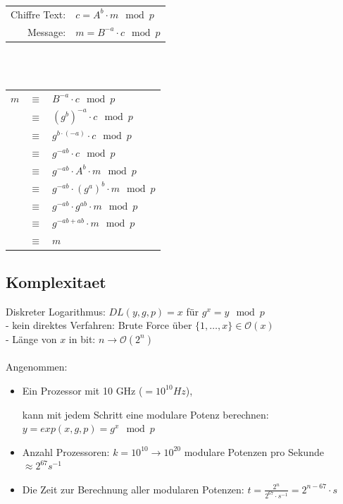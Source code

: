 \documentclass[
  a4paper,
  11pt,
]{article}
\begin{document}
\begin{center}

\begin{tabular}{rl}
	Chiffre Text:	&	$c=A^b\cdot m\mod p$\\
	Message:		&	$m=B^{-a}\cdot c\mod p$\\
\end{tabular}

\ \\ \ \\

\begin{tabular}{rcl}
	$m$		&	$\equiv$ &	$B^{-a}\cdot c\mod p$\\
			&	$\equiv$	&	$(g^b)^{-a}\cdot c\mod p$\\
			&	$\equiv$	&	$g^{b\cdot (-a)}\cdot c\mod p$\\
			&	$\equiv$	&	$g^{-ab}\cdot c\mod p$\\
			&	$\equiv$	&	$g^{-ab}\cdot A^b\cdot m\mod p$\\
			&	$\equiv$	&	$g^{-ab}\cdot (g^a)^b\cdot m\mod p$\\
			&	$\equiv$	&	$g^{-ab}\cdot g^{ab}\cdot m\mod p$\\
			&	$\equiv$	&	$g^{-ab+ab}\cdot m\mod p$\\
			&	$\equiv$	&	$m$\\
\end{tabular}
\end{center}

\subsection*{Komplexitaet}
\label{sub:Komplexitaet}

Diskreter Logarithmus: $DL(y, g, p) = x$ für $g^x=y\mod p$\\
- kein direktes Verfahren: Brute Force über $\{1, \ldots, x\}\in \mathcal O(x)$\\
- Länge von $x$ in bit: $n \rightarrow \mathcal O(2^n)$\\\\

Angenommen:\\
\begin{itemize}
  \item Ein Prozessor mit 10 GHz ($= 10^{10}Hz$),

    kann mit jedem Schritt eine modulare Potenz berechnen: $y=exp(x,g,p)=g^x\mod
    p$
  \item Anzahl Prozessoren: $k=10^{10} \rightarrow 10^{20}$ modulare Potenzen
    pro Sekunde $\approx 2^{67} s^{-1}$
  \item Die Zeit zur Berechnung aller modularen Potenzen: $t=\frac{2^n}{2^{67}\cdot
    s^{-1}}=2^{n-67}\cdot s$
\end{itemize}
\end{document}
